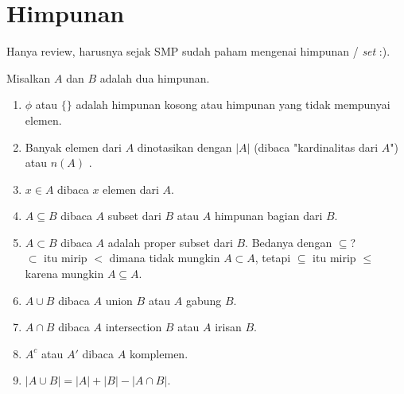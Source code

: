 \section{Himpunan}
Hanya review, harusnya sejak SMP sudah paham mengenai himpunan / \textit{set} :).

Misalkan $A$ dan $B$ adalah dua himpunan.
\begin{enumerate}
    \item $\phi$ atau $\{\}$ adalah himpunan kosong atau himpunan yang tidak mempunyai elemen.
    \item Banyak elemen dari $A$ dinotasikan dengan $|A|$ (dibaca "kardinalitas dari $A$") atau $n(A)$ .
    \item $x \in A$ dibaca $x$ elemen dari $A$.
    \item $A \subseteq B$ dibaca $A$ subset dari $B$ atau $A$ himpunan bagian dari $B$.
    \item $A \subset B$ dibaca $A$ adalah proper subset dari $B$. Bedanya dengan $\subseteq$?\\
    $\subset$ itu mirip $<$ dimana tidak mungkin $A \subset A$, tetapi $\subseteq$ itu mirip $\le$ karena mungkin $A \subseteq A$.
    \item $A \cup B$ dibaca $A$ union $B$ atau $A$ gabung $B$.
    \item $A \cap B$ dibaca $A$ intersection $B$ atau $A$ irisan $B$.
    \item $A^c$ atau $A'$ dibaca $A$ komplemen.
    \item $|A \cup B| = |A|+|B|-|A \cap B|$.
\end{enumerate}
	
